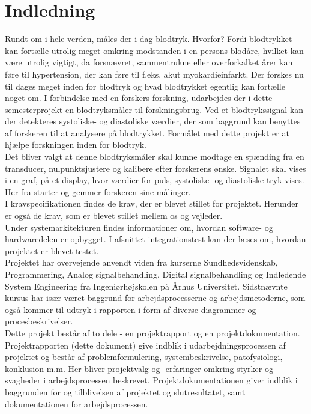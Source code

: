 
\chapter{Indledning}
Rundt om i hele verden, måles der i dag blodtryk. Hvorfor? Fordi blodtrykket kan fortælle utrolig meget omkring modstanden i en persons blodåre, hvilket kan være utrolig vigtigt, da forsnævret, sammentrukne eller overforkalket årer kan føre til hypertension, der kan føre til f.eks. akut myokardieinfarkt. Der forskes nu til dages meget inden for blodtryk og hvad blodtrykket egentlig kan fortælle noget om. I forbindelse med en forskers forskning, udarbejdes der i dette semesterprojekt en blodtryksmåler til forskningsbrug. Ved et blodtrykssignal kan der detekteres systoliske- og diastoliske værdier, der som baggrund kan benyttes af forskeren til at analysere på blodtrykket. Formålet med dette projekt er at hjælpe forskningen inden for blodtryk. \\
Det bliver valgt at denne blodtryksmåler skal kunne modtage en spænding fra en transducer, nulpunktsjustere og kalibere efter forskerens ønske. Signalet skal vises i en graf, på et display, hvor værdier for puls, systoliske- og diastoliske tryk vises. Her fra starter og gemmer forskeren sine målinger. \\
I kravspecifikationen findes de krav, der er blevet stillet for projektet. Herunder er også de krav, som er blevet stillet mellem os og vejleder. \\
Under systemarkitekturen findes informationer om, hvordan software- og hardwaredelen er opbygget.  I afsnittet integrationstest kan der læses om, hvordan projektet er blevet testet. \\
Projektet har overvejende anvendt viden fra kurserne Sundhedsvidenskab, Programmering, Analog signalbehandling, Digital signalbehandling og Indledende System Engineering fra Ingeniørhøjskolen på Århus Universitet. Sidstnævnte kursus har især været baggrund for arbejdsprocesserne og arbejdsmetoderne, som også kommer til udtryk i rapporten i form af diverse diagrammer og procesbeskrivelser. \\
Dette projekt består af to dele - en projektrapport og en projektdokumentation. Projektrapporten (dette dokument) give indblik i udarbejdningsprocessen af projektet og består af problemformulering, systembeskrivelse, patofysiologi, konklusion m.m. Her bliver projektvalg og -erfaringer omkring styrker og svagheder i arbejdsprocessen beskrevet. Projektdokumentationen giver indblik i baggrunden for og tilblivelsen af projektet og slutresultatet, samt dokumentationen for arbejdsprocessen. \\

